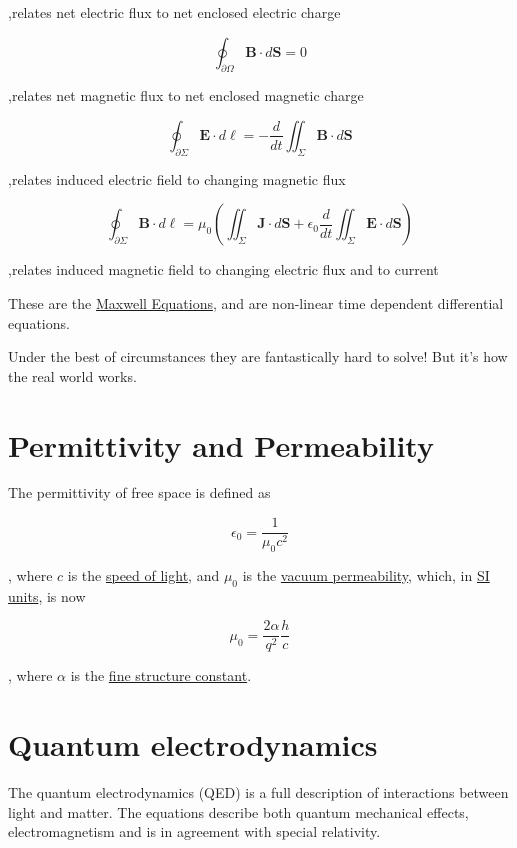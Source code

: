,relates net electric flux to net enclosed electric charge

\[ \oint_{\partial \Omega} \mathbf{B} \cdot d\mathbf{S} = 0\]

,relates net magnetic flux to net enclosed magnetic charge

\[ \oint_{\partial \Sigma} \mathbf{E} \cdot d\mathbf{\ell} = - \frac{d}{dt}\iint_\Sigma \mathbf{B}
\cdot d\mathbf{S}\]

,relates induced electric field to changing magnetic flux

\[ \oint_{\partial \Sigma} \mathbf{B} \cdot d\mathbf{\ell} = \mu_0\left(
\iint_\Sigma \mathbf{J} \cdot d\mathbf{S} + \epsilon_0 \frac{d}{dt}\iint_\Sigma
\mathbf{E} \cdot d\mathbf{S} \right)\]

,relates induced magnetic field to changing electric flux and to current

These are the
\href{https://en.wikipedia.org/wiki/Maxwell\%27s_equations}{Maxwell
Equations}, and are non-linear time dependent differential equations.

Under the best of circumstances they are fantastically hard to solve!
But it's how the real world works.

\section{Permittivity and
Permeability}\label{permittivity-and-permeability}

The permittivity of free space is defined as

\[\epsilon_0 = \frac{1}{\mu_0 c^2}\]

, where \(c\) is the
\href{https://en.wikipedia.org/wiki/Speed_of_light}{speed of light}, and
\(\mu_0\) is the
\href{https://en.wikipedia.org/wiki/Vacuum_permeability}{vacuum
permeability}, which, in
\href{https://en.wikipedia.org/wiki/International_System_of_Units}{SI
units}, is now

\[\mu_0 = \frac{2 \alpha}{q^2}\frac{h}{c}\]

, where \(\alpha\) is the
\href{https://en.wikipedia.org/wiki/Fine-structure_constant}{fine
structure constant}.

\section{Quantum electrodynamics}\label{quantum-electrodynamics}

The quantum electrodynamics (QED) is a full description of interactions
between light and matter. The equations describe both quantum mechanical
effects, electromagnetism and is in agreement with special relativity.


